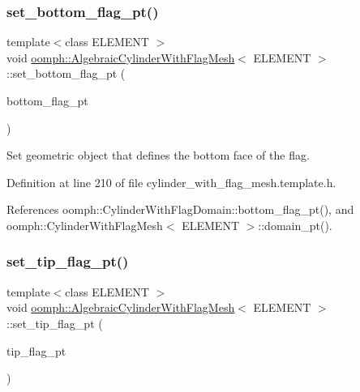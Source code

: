 \subsubsection{\texorpdfstring{set\+\_\+bottom\+\_\+flag\+\_\+pt()}{set\_bottom\_flag\_pt()}}
{\footnotesize\ttfamily template$<$class E\+L\+E\+M\+E\+NT $>$ \\
void \hyperlink{classoomph_1_1AlgebraicCylinderWithFlagMesh}{oomph\+::\+Algebraic\+Cylinder\+With\+Flag\+Mesh}$<$ E\+L\+E\+M\+E\+NT $>$\+::set\+\_\+bottom\+\_\+flag\+\_\+pt (\begin{DoxyParamCaption}\item[{Geom\+Object $\ast$}]{bottom\+\_\+flag\+\_\+pt }\end{DoxyParamCaption})\hspace{0.3cm}{\ttfamily [inline]}}



Set geometric object that defines the bottom face of the flag. 



Definition at line 210 of file cylinder\+\_\+with\+\_\+flag\+\_\+mesh.\+template.\+h.



References oomph\+::\+Cylinder\+With\+Flag\+Domain\+::bottom\+\_\+flag\+\_\+pt(), and oomph\+::\+Cylinder\+With\+Flag\+Mesh$<$ E\+L\+E\+M\+E\+N\+T $>$\+::domain\+\_\+pt().

\mbox{\label{classoomph_1_1AlgebraicCylinderWithFlagMesh_a191d736d9acbeb5927fc5f472420e9f6}} 
\subsubsection{\texorpdfstring{set\+\_\+tip\+\_\+flag\+\_\+pt()}{set\_tip\_flag\_pt()}}
{\footnotesize\ttfamily template$<$class E\+L\+E\+M\+E\+NT $>$ \\
void \hyperlink{classoomph_1_1AlgebraicCylinderWithFlagMesh}{oomph\+::\+Algebraic\+Cylinder\+With\+Flag\+Mesh}$<$ E\+L\+E\+M\+E\+NT $>$\+::set\+\_\+tip\+\_\+flag\+\_\+pt (\begin{DoxyParamCaption}\item[{Geom\+Object $\ast$}]{tip\+\_\+flag\+\_\+pt }\end{DoxyParamCaption})\hspace{0.3cm}{\ttfamily [inline]}}




